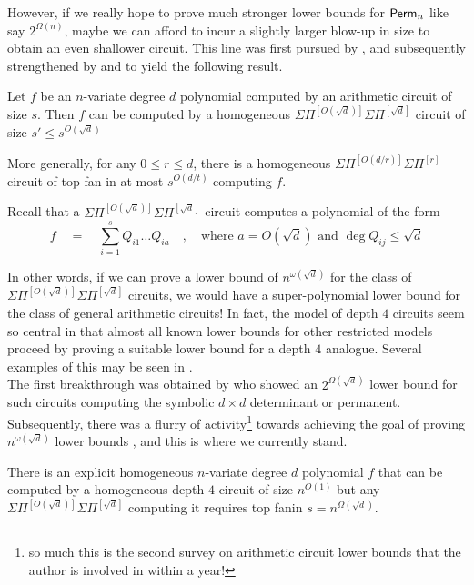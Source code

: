 \documentclass{beatcs}
\newcommand{\spaced}[1]{\quad#1\quad}
\newcommand{\SPSPfanin}[2]{\Sigma\Pi^{[#1]}\Sigma\Pi^{[#2]}}
\begin{document}
However, if we really hope to prove much stronger lower bounds for $\mathsf{Perm}_n$ like say $2^{\Omega(n)}$, maybe we can afford to incur a slightly larger blow-up in size to obtain an even shallower circuit. This line was first pursued by \cite{av08}, and subsequently strengthened by \cite{koiran} and \cite{Tav13} to yield the following result. 

\begin{theorem} \label{thm:av}
  Let $f$ be an $n$-variate degree $d$ polynomial computed by an arithmetic circuit of size $s$. Then $f$ can be computed by a homogeneous $\SPSPfanin{O(\sqrt{d})}{\sqrt{d}}$ circuit of size $s' \leq s^{O(\sqrt{d})}$

More generally, for any $0\leq r\leq d$, there is a homogeneous $\SPSPfanin{O(d/r)}{r}$ circuit of top fan-in at most $s^{O(d/t)}$ computing $f$. 
\end{theorem}

Recall that a $\SPSPfanin{O(\sqrt{d})}{\sqrt{d}}$ circuit computes a polynomial of the form
\[
f\spaced{=} \sum_{i=1}^s Q_{i1}\dots Q_{ia} \quad,\quad \text{where $a = O(\sqrt{d})$ and $\deg Q_{ij} \leq \sqrt{d}$}
\]

In other words, if we can prove a lower bound of $n^{\omega(\sqrt{d})}$ for the class of $\SPSPfanin{O(\sqrt{d})}{\sqrt{d}}$ circuits, we would have a super-polynomial lower bound for the class of general arithmetic circuits! In fact, the model of depth $4$ circuits seem so central in that almost all known lower bounds for other restricted models proceed by proving a suitable lower bound for a depth $4$ analogue. Several examples of this may be seen in \cite{KayalRP}. \\

The first breakthrough was obtained by \cite{gkks13} who showed an $2^{\Omega(\sqrt{d})}$ lower bound for such circuits computing the symbolic $d\times d$ determinant or permanent. Subsequently, there was a flurry of activity\footnote{so much this is the second survey on arithmetic circuit lower bounds that the author is involved in within a year!} towards achieving the goal of proving $n^{\omega(\sqrt{d})}$ lower bounds \cite{KSS13,FLMS13,KS14a}, and this is where we currently stand. 

\begin{theorem}
There is an explicit homogeneous $n$-variate degree $d$ polynomial $f$ that can be computed by a homogeneous depth $4$ circuit of size $n^{O(1)}$ but any $\SPSPfanin{O(\sqrt{d})}{\sqrt{d}}$ computing it requires top fanin $s = n^{\Omega(\sqrt{d})}$.
\end{theorem}
\end{document}
